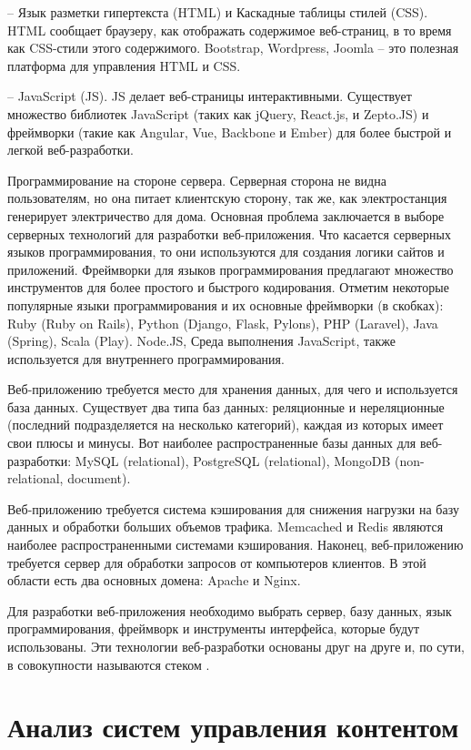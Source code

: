 -- Язык разметки гипертекста (HTML) и Каскадные таблицы стилей (CSS).
HTML сообщает браузеру, как отображать содержимое веб-страниц, в то время как CSS-стили этого содержимого.
Bootstrap, Wordpress, Joomla – это полезная платформа для управления HTML и CSS.

-- JavaScript (JS). JS делает веб-страницы интерактивными.
Существует множество библиотек JavaScript (таких как jQuery, React.js, и Zepto.JS) и фреймворки (такие как Angular, Vue, Backbone и Ember) для более быстрой и легкой веб-разработки.

Программирование на стороне сервера.
Серверная сторона не видна пользователям, но она питает клиентскую сторону, так же, как электростанция генерирует электричество для дома.
Основная проблема заключается в выборе серверных технологий для разработки веб-приложения.
Что касается серверных языков программирования, то они используются для создания логики сайтов и приложений.
Фреймворки для языков программирования предлагают множество инструментов для более простого и быстрого кодирования.
Отметим некоторые популярные языки программирования и их основные фреймворки (в скобках): Ruby (Ruby on Rails), Python (Django, Flask, Pylons), PHP (Laravel), Java (Spring), Scala (Play).
Node.JS, Среда выполнения JavaScript, также используется для внутреннего программирования.

Веб-приложению требуется место для хранения данных, для чего и используется база данных.
Существует два типа баз данных: реляционные и нереляционные (последний подразделяется на несколько категорий), каждая из которых имеет свои плюсы и минусы.
Вот наиболее распространенные базы данных для веб-разработки: MySQL (relational), PostgreSQL (relational), MongoDB (non-relational, document).

Веб-приложению требуется система кэширования для снижения нагрузки на базу данных и обработки больших объемов трафика.
Memcached и Redis являются наиболее распространенными системами кэширования.
Наконец, веб-приложению требуется сервер для обработки запросов от компьютеров клиентов.
В этой области есть два основных домена: Apache и Nginx.

Для разработки веб-приложения необходимо выбрать сервер, базу данных, язык программирования, фреймворк и инструменты интерфейса, которые будут использованы.
Эти технологии веб-разработки основаны друг на друге и, по сути, в совокупности называются стеком \cite{ualiev-jebegenov-issledovanie-1}.
\clearpage
\section{Анализ систем управления контентом}

